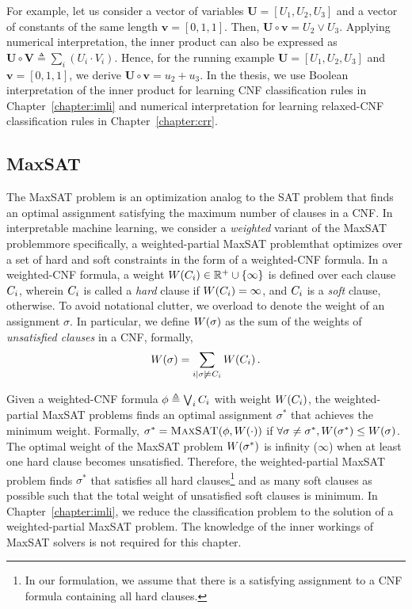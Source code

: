 For example, let us consider a vector of variables $ \mathbf{U} = [U_1, U_2, U_3] $ and a vector of constants of the same length $ \mathbf{v} = [0,1,1] $. Then, $ \mathbf{U} \circ \mathbf{v} = U_2 \vee U_3 $. Applying numerical interpretation, the inner product can also be expressed as $\mathbf{U} \circ \mathbf{V} \triangleq \sum_{i} (U_{i} \cdot V_{i}) $. Hence, for the running example $ \mathbf{U} = [U_1, U_2, U_3] $ and $ \mathbf{v} = [0,1,1] $, we derive $ \mathbf{U} \circ \mathbf{v} = u_2  + u_3 $. In the thesis, we use Boolean interpretation of the inner product for learning CNF classification rules in Chapter~\ref{chapter:imli} and numerical interpretation for learning relaxed-CNF classification rules in Chapter~\ref{chapter:crr}.




\subsection{MaxSAT}

The MaxSAT problem is an optimization analog to the SAT problem that finds an optimal assignment satisfying the maximum number of clauses in a CNF. In interpretable machine learning, we consider a \emph{weighted} variant of the MaxSAT problem\textemdash more specifically, a weighted-partial MaxSAT problem\textemdash that optimizes over a set of hard and soft constraints in the form of a weighted-CNF formula. In a weighted-CNF formula, a weight $ {W \! \left( C_i \right)} \in \mathbb{R}^+ \cup \{\infty\} $ is defined over each clause $ C_i $, wherein $C_i$ is called a \emph{hard} clause if $W \! \left( C_i \right) = \infty$, and  $C_i$ is  a \emph{soft} clause, otherwise.  To avoid notational clutter, we overload {\clauseweight{\cdot}} to denote the weight of an assignment $ \sigma $. In particular, we define $W \! \left( \sigma \right)$ as the sum of the weights of \emph{unsatisfied clauses} in a CNF, formally, $$W \! \left( \sigma \right) = \sum_{i | \sigma \not \models C_i} W \! \left( C_i \right).$$


Given a weighted-CNF formula $\phi \triangleq \bigvee_i C_i$ with weight $ W \! \left( C_i \right) $, the weighted-partial MaxSAT problems finds an optimal assignment $\sigma^*$ that achieves the minimum weight. Formally,  $\sigma^* = \textsc{MaxSAT}(\phi,W \! \left( \cdot \right))$ if $\forall \sigma \neq \sigma^*, W \! \left( \sigma^* \right) \leq W \! \left( \sigma \right)$. The optimal weight of the MaxSAT problem $  W \! \left( \sigma^* \right) $ is infinity ($ \infty $) when at least one hard clause becomes unsatisfied.  Therefore,  the weighted-partial MaxSAT problem finds $ \sigma^* $ that satisfies all hard clauses\footnote{In our formulation, we assume that there is a satisfying assignment to a CNF formula containing all hard clauses.} and as many soft clauses as possible such that the total weight of unsatisfied soft clauses is minimum. In Chapter~\ref{chapter:imli}, we reduce the classification problem  to the solution of a weighted-partial MaxSAT problem. The knowledge of the inner workings of {MaxSAT} solvers is  not required for this chapter.  


